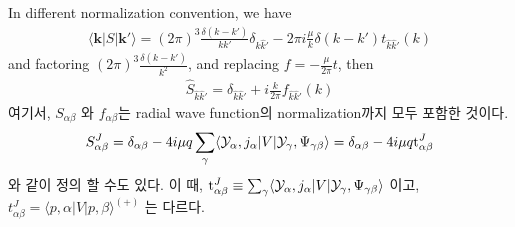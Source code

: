\documentclass[10pt]{article}
\def\bm{\boldsymbol}
\newcommand{\bea}{\begin{eqnarray}}
\newcommand{\eea}{\end{eqnarray}}
\def\vk{{\bm k}}
\def\la{\langle}
\def\ra{\rangle}
\begin{document}
\begin{itemize}
{In different normalization convention, we have
\bea
\la \vk|S|\vk'\ra
=(2\pi)^3\frac{\delta(k-k')}{k k'}\delta_{\hat{k}\hat{k}'}
-2\pi i\frac{\mu}{k}\delta(k-k') t_{\hat{k}\hat{k}'}(k) 
\eea
and factoring $(2\pi)^3\frac{\delta(k-k')}{k^2}$, 
and replacing $f=-\frac{\mu}{2\pi} t$, then
\bea
\hat{S}_{\hat{k}\hat{k}'}=\delta_{\hat{k}\hat{k}'}
                        +i\frac{k}{2\pi} f_{\hat{k}\hat{k}'}(k)
\eea
}
여기서, $S_{\alpha\beta}$ 와 $f_{\alpha\beta}$는 
radial wave function의 normalization까지 모두 포함한 것이다.
\bea
S^J_{\alpha\beta}=\delta_{\alpha\beta}-4i\mu q\sum_{\gamma}
\la {\cal Y}_\alpha, j_{\alpha}|V|{\cal Y}_{\gamma},\Psi_{\gamma\beta}\ra
=\delta_{\alpha\beta}-4i\mu q {\rm t}^J_{\alpha\beta}
\eea
와 같이 정의 할 수도 있다. 이 때, 
${\rm t}^J_{\alpha\beta}\equiv \sum_{\gamma}
\la {\cal Y}_\alpha, j_{\alpha}|V|{\cal Y}_{\gamma},\Psi_{\gamma\beta}\ra$ 이고,
$t^J_{\alpha\beta}=\la p,\alpha|V|p,\beta\ra^{(+)}$ 는 다르다.

\end{itemize}
\end{document}

